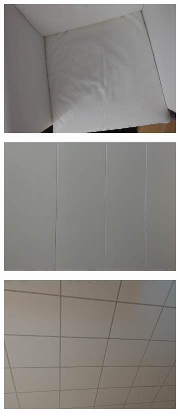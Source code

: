 \begin{figure}[h!t]
    \begin{subfigure}[b]{0.25\textwidth}
        \centering
        \includegraphics[width=0.9\linewidth]{images/materials/leather-cam}
    \end{subfigure}%
    \begin{subfigure}[b]{0.25\textwidth}
        \centering
        \includegraphics[width=0.9\linewidth]{images/materials/whiteFurniture-cam}
    \end{subfigure}%
    \begin{subfigure}[b]{0.25\textwidth}
        \centering
        \includegraphics[width=0.9\linewidth]{images/materials/tiles-cam}

\end{subfigure}
\end{figure}
